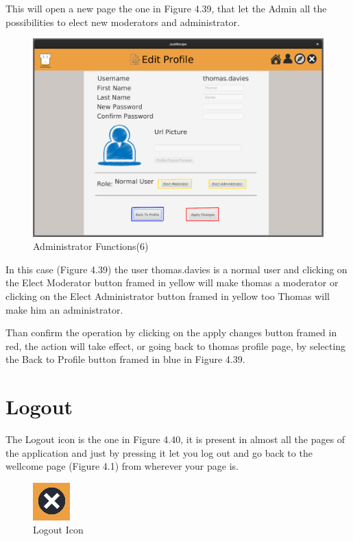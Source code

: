 \documentclass[a4paper]{report}
\begin{document}
\noindent This will open a new page the one in Figure 4.39, that let the Admin all the possibilities to elect new moderators and administrator.
\begin{figure}[htpb]
	\centering
	\includegraphics[scale=0.37]{img/user_manual/administratorFunction6.png}
	\caption{Administrator Functions(6)}
\end{figure}

\noindent In this case (Figure 4.39) the user thomas.davies is a normal user and clicking on the Elect Moderator button framed in yellow will make thomas a moderator or clicking on the Elect Administrator button framed in yellow too Thomas will make him an administrator.

\noindent Than confirm the operation by clicking on the apply changes button framed in red, the action will take effect, or going back to thomas profile page, by selecting the Back to Profile button framed in blue in Figure 4.39.

\section{Logout}
The Logout icon is the one in Figure 4.40, it is present in almost all the pages of the application and just by pressing it let you log out and go back to the wellcome page (Figure 4.1) from wherever your page is.
\begin{figure}[htpb]
	\centering
	\includegraphics[scale=0.37]{img/user_manual/logoutIcon.png}
	\caption{Logout Icon}
\end{figure}
\end{document}
